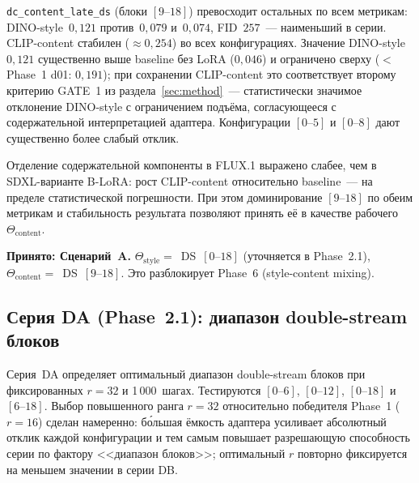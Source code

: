 \texttt{dc\_content\_late\_ds} (блоки $[9\text{--}18]$) превосходит остальных по всем метрикам: DINO-style~$0{,}121$ против~$0{,}079$ и~$0{,}074$, FID~$257$~--- наименьший в серии. CLIP-content стабилен ($\approx 0{,}254$) во всех конфигурациях. Значение DINO-style $0{,}121$ существенно выше baseline без LoRA ($0{,}046$) и ограничено сверху ($<$ Phase~1 d01: $0{,}191$); при сохранении CLIP-content это соответствует второму критерию GATE~1 из раздела~\ref{sec:method}~--- статистически значимое отклонение DINO-style с ограничением подъёма, согласующееся с содержательной интерпретацией адаптера. Конфигурации $[0\text{--}5]$ и $[0\text{--}8]$ дают существенно более слабый отклик.

Отделение содержательной компоненты в FLUX.1 выражено слабее, чем в SDXL-варианте B-LoRA: рост CLIP-content относительно baseline~--- на пределе статистической погрешности. При этом доминирование $[9\text{--}18]$ по обеим метрикам и стабильность результата позволяют принять её в качестве рабочего $\Theta_\text{content}$.

\textbf{Принято: Сценарий~A.} $\Theta_\text{style}{=}$~DS~$[0\text{--}18]$ (уточняется в Phase~2.1), $\Theta_\text{content}{=}$~DS~$[9\text{--}18]$. Это разблокирует Phase~6 (style-content mixing).

\subsection{Серия DA (Phase~2.1): диапазон double-stream блоков}
\label{sec:results_phase2_da}

Серия~DA определяет оптимальный диапазон double-stream блоков при фиксированных $r{=}32$ и 1\,000~шагах. Тестируются $[0\text{--}6]$, $[0\text{--}12]$, $[0\text{--}18]$ и $[6\text{--}18]$. Выбор повышенного ранга $r{=}32$ относительно победителя Phase~1 ($r{=}16$) сделан намеренно: б\'{о}льшая ёмкость адаптера усиливает абсолютный отклик каждой конфигурации и тем самым повышает разрешающую способность серии по фактору <<диапазон блоков>>; оптимальный $r$ повторно фиксируется на меньшем значении в серии DB.

